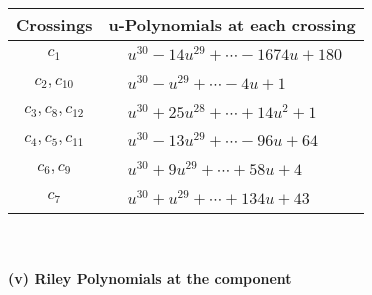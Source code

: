 \documentclass[1p]{elsarticle_modified}
\theoremstyle{definition}
\begin{document}
\begin{tabular}{m{50pt}|m{274pt}}
Crossings & \hspace{64pt}u-Polynomials at each crossing \\
\hline $$\begin{aligned}c_{1}\end{aligned}$$&$\begin{aligned}
&u^{30}-14 u^{29}+\cdots-1674 u+180
\end{aligned}$\\
\hline $$\begin{aligned}c_{2},c_{10}\end{aligned}$$&$\begin{aligned}
&u^{30}- u^{29}+\cdots-4 u+1
\end{aligned}$\\
\hline $$\begin{aligned}c_{3},c_{8},c_{12}\end{aligned}$$&$\begin{aligned}
&u^{30}+25 u^{28}+\cdots+14 u^2+1
\end{aligned}$\\
\hline $$\begin{aligned}c_{4},c_{5},c_{11}\end{aligned}$$&$\begin{aligned}
&u^{30}-13 u^{29}+\cdots-96 u+64
\end{aligned}$\\
\hline $$\begin{aligned}c_{6},c_{9}\end{aligned}$$&$\begin{aligned}
&u^{30}+9 u^{29}+\cdots+58 u+4
\end{aligned}$\\
\hline $$\begin{aligned}c_{7}\end{aligned}$$&$\begin{aligned}
&u^{30}+u^{29}+\cdots+134 u+43
\end{aligned}$\\
\hline
\end{tabular}\\~\\
\newpage\renewcommand{\arraystretch}{1}
\flushleft \textbf{(v) Riley Polynomials at the component}\newline \\
\end{document}
